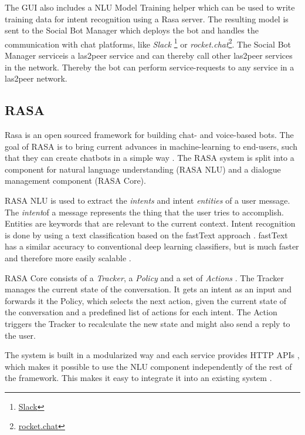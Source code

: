 The GUI also includes a NLU Model Training helper which can be used to write training data for intent recognition using a Rasa server.
The resulting model is sent to the Social Bot Manager which deploys the bot and handles the communication with chat platforms, like \emph{Slack} \footnote{\href{https://slack.com/}{Slack}} or \emph{rocket.chat}\footnote{\href{https://rocket.chat/}{rocket.chat}}. 
The Social Bot Manager service\footnotemark is a las2peer service and can thereby call other las2peer services in the network. 
Thereby the bot can perform service-requests to any service in a las2peer network.

\subsection{RASA}
Rasa is an open sourced framework for building chat- and voice-based bots. The goal of RASA is to bring current advances in machine-learning to end-users, such that they can create chatbots in a simple way \cite{BFPN17}. 
The RASA system is split into a component for natural language understanding (RASA NLU) and a dialogue management component (RASA Core).

RASA NLU is used to extract the \emph{intents} and intent \emph{entities} of a user message.
The \emph{intent}\footnotemark of a message represents the thing that the user tries to accomplish. 
Entities are keywords that are relevant to the current context.
Intent recognition is done by using a text classification based on the fastText approach \cite{BFPN17}. 
fastText has a similar accuracy to conventional deep learning classifiers, but is much faster and therefore more easily scalable \cite{JGBM16}.


RASA Core consists of a \emph{Tracker}, a \emph{Policy} and a set of \emph{Actions} \cite{BFPN17}. The Tracker manages the current state of the conversation. It gets an intent as an input and forwards it the Policy, which selects the next action, given the current state of the conversation and a predefined list of actions for each intent. The Action triggers the Tracker to recalculate the new state and might also send a reply to the user.

The system is built in a modularized way and each service provides HTTP APIs \cite{BFPN17}, which makes it possible to use the NLU component independently of the rest of the framework. This makes it easy to integrate it into an existing system \cite{RaKe19}.


